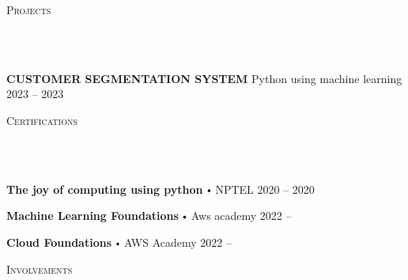 \documentclass{article}
\newcommand{\project}[4]{{
          \vspace*{2pt}%
          \textbf{#1} #2 \hfill #3\\ #4 \vspace*{2pt}}
          }
\newcommand{\lineunder}{
        \vspace*{-8pt} \\ \hspace*{-18pt} 
        \hrulefill \\
        }
\newcommand{\header}[1]{{
        \hspace*{-15pt}\vspace*{6pt} \textsc{#1}} \vspace*{-6pt} 
        \lineunder
        }
\renewcommand{\labelitemi}{
        $\vcenter{\hbox{\tiny$\bullet$}}$\hspace*{3pt}
        }
\renewcommand{\labelitemii}{
        $\vcenter{\hbox{\tiny$\bullet$}}$\hspace*{-3pt}
        }
\newenvironment{bullet-list-major}{
          \begin{list}{\labelitemii}{\setlength\leftmargin{3pt} 
          \topsep 0pt \itemsep -2pt}}{\vspace*{4pt}\end{list}
          }
\newenvironment{bullet-list-minor}{
          \begin{list}{\labelitemii}{\setlength\leftmargin{15pt} 
            \topsep 0pt \itemsep -2pt}}{\vspace*{4pt}\end{list}
            }
\begin{document}
      \vspace*{4pt}%
      \header{Projects}
      {
      \project{CUSTOMER SEGMENTATION SYSTEM}{Python using machine learning}{2023 -- 2023}{
          \begin{bullet-list-minor}
              
          \end{bullet-list-minor}
      }
  }
  
      \vspace*{4pt}%
      \header{Certifications}
      {
        \begin{bullet-list-major}
        \item \textbf{The joy of computing using python} \labelitemi NPTEL \hfill 2020 -- 2020
        \end{bullet-list-major}
        

        \begin{bullet-list-major}
        \item \textbf{Machine Learning Foundations} \labelitemi Aws academy \hfill 2022 -- 
        \end{bullet-list-major}
        

        \begin{bullet-list-major}
        \item \textbf{Cloud Foundations} \labelitemi AWS Academy \hfill 2022 -- 
        \end{bullet-list-major}
        }
      \vspace*{4pt}%
      \header{Involvements}
\end{document}
